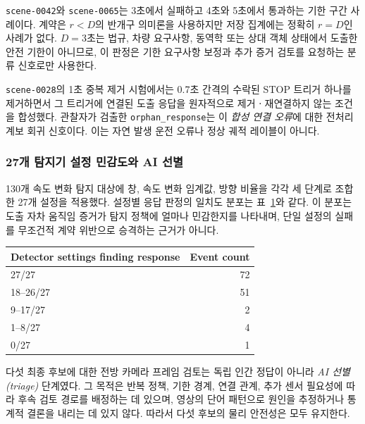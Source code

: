 \texttt{scene-0042}와 \texttt{scene-0065}는 3초에서 실패하고 4초와 5초에서 통과하는 기한 구간 사례이다. 계약은 $r<D$의 반개구 의미론을 사용하지만 저장 집계에는 정확히 $r=D$인 사례가 없다. $D=3$초는 법규, 차량 요구사항, 동역학 또는 상대 객체 상태에서 도출한 안전 기한이 아니므로, 이 판정은 기한 요구사항 보정과 추가 증거 검토를 요청하는 분류 신호로만 사용한다.

\texttt{scene-0028}의 1초 중복 제거 시험에서는 0.7초 간격의 수락된 STOP 트리거 하나를 제거하면서 그 트리거에 연결된 도출 응답을 원자적으로 제거ㆍ재연결하지 않는 조건을 합성했다. 관찰자가 검출한 \texttt{orphan\_response}는 이 \emph{합성 연결 오류}에 대한 전처리 계보 회귀 신호이다. 이는 자연 발생 운전 오류나 정상 궤적 레이블이 아니다.

\subsubsection{27개 탐지기 설정 민감도와 AI 선별}

130개 속도 변화 탐지 대상에 창, 속도 변화 임계값, 방향 비율을 각각 세 단계로 조합한 27개 설정을 적용했다. 설정별 응답 판정의 일치도 분포는 표~\ref{tab:detector-sensitivity}와 같다. 이 분포는 도출 자차 움직임 증거가 탐지 정책에 얼마나 민감한지를 나타내며, 단일 설정의 실패를 무조건적 계약 위반으로 승격하는 근거가 아니다.

\begin{table}[t]
\centering
{}
\label{tab:detector-sensitivity}
\footnotesize
\begin{tabular}{lr}
\toprule
Detector settings finding response & Event count \\
\midrule
27/27 & 72 \\
18--26/27 & 51 \\
9--17/27 & 2 \\
1--8/27 & 4 \\
0/27 & 1 \\
\bottomrule
\end{tabular}
\end{table}

다섯 최종 후보에 대한 전방 카메라 프레임 검토는 독립 인간 정답이 아니라 \emph{AI 선별(triage)} 단계였다. 그 목적은 반복 정책, 기한 경계, 연결 관계, 추가 센서 필요성에 따라 후속 검토 경로를 배정하는 데 있으며, 영상의 단어 패턴으로 원인을 추정하거나 통계적 결론을 내리는 데 있지 않다. 따라서 다섯 후보의 물리 안전성은 모두  유지한다.

